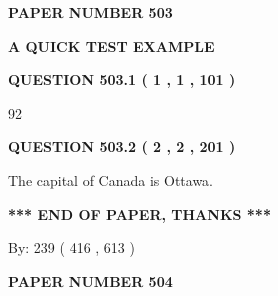 \documentclass[12pt]{article}
\begin{document}
   
   
   
\newpage 
\setcounter{page}{ 
   503001 } 
   
   
   
   
 {\textbf{ \Large{ PAPER NUMBER  503  }}}
   
   
\vspace{0.2in}
   
   
   
   
   
   
 \vspace{0.2in}
{\LARGE {\textbf{ A QUICK TEST EXAMPLE}}}
   
   
  
\vspace{0.2in}
  
{\textbf{\Large{QUESTION
503.1 
 ( 1 , 1 , 101 )
}}}
  
  
 
 
\noindent{}

92
 
 
  
\vspace{0.2in}
  
{\textbf{\Large{QUESTION
503.2 
 ( 2 , 2 , 201 )
}}}
  
  
 
 
\noindent{}
 
 
The capital of Canada is Ottawa.
 
 
 
 
   
   
 \vspace{0.2in}
 
   
   
   
   
\vspace{1.0in} 
{\textbf{\large{ *** END OF PAPER, THANKS *** }}} 
   
   
\hspace{1.0in} By: 
 239 ( 416 ,  613 )
   
   
   
   
\newpage 
\setcounter{page}{ 
   504001 } 
   
   
   
   
 {\textbf{ \Large{ PAPER NUMBER  504  }}}
   
\end{document}
